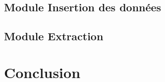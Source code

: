 \documentclass[11pt]{article}
\begin{document}
\subsection{Module Insertion des données}
\subsection{Module Extraction}

\section{Conclusion}
\end{document}
